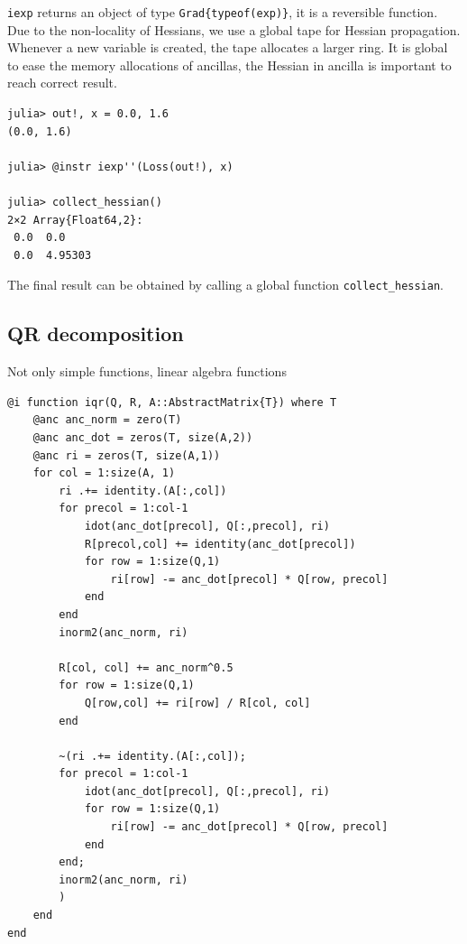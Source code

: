 \documentclass[aps,twocolumn,longbibliography,english,superscriptaddress,prr]{revtex4-1}
\newcommand{\<}{\langle}
\renewcommand{\>}{\rangle}
\theoremstyle{definition}\newtheorem{definition}{\textit{Definition}}
\begin{document}
\texttt{iexp\textquotesingle} returns an object of type \texttt{Grad\{typeof(exp)\}}, it is a reversible function.
Due to the non-locality of Hessians, we use a global tape for Hessian propagation. Whenever a new variable is created, the tape allocates a larger ring.
It is global to ease the memory allocations of ancillas, the Hessian in ancilla is important to reach correct result.

\begin{minipage}{.44\textwidth}
\begin{lstlisting}
julia> out!, x = 0.0, 1.6
(0.0, 1.6)

julia> @instr iexp''(Loss(out!), x)

julia> collect_hessian()
2×2 Array{Float64,2}:
 0.0  0.0
 0.0  4.95303
\end{lstlisting}
\end{minipage}

The final result can be obtained by calling a global function \texttt{collect\_hessian}.

\subsection{QR decomposition}

Not only simple functions, linear algebra functions 

\begin{minipage}{.44\textwidth}
\begin{lstlisting}
@i function iqr(Q, R, A::AbstractMatrix{T}) where T
    @anc anc_norm = zero(T)
    @anc anc_dot = zeros(T, size(A,2))
    @anc ri = zeros(T, size(A,1))
    for col = 1:size(A, 1)
        ri .+= identity.(A[:,col])
        for precol = 1:col-1
            idot(anc_dot[precol], Q[:,precol], ri)
            R[precol,col] += identity(anc_dot[precol])
            for row = 1:size(Q,1)
                ri[row] -= anc_dot[precol] * Q[row, precol]
            end
        end
        inorm2(anc_norm, ri)

        R[col, col] += anc_norm^0.5
        for row = 1:size(Q,1)
            Q[row,col] += ri[row] / R[col, col]
        end

        ~(ri .+= identity.(A[:,col]);
        for precol = 1:col-1
            idot(anc_dot[precol], Q[:,precol], ri)
            for row = 1:size(Q,1)
                ri[row] -= anc_dot[precol] * Q[row, precol]
            end
        end;
        inorm2(anc_norm, ri)
        )
    end
end
\end{lstlisting}
\end{minipage}
\end{document}
